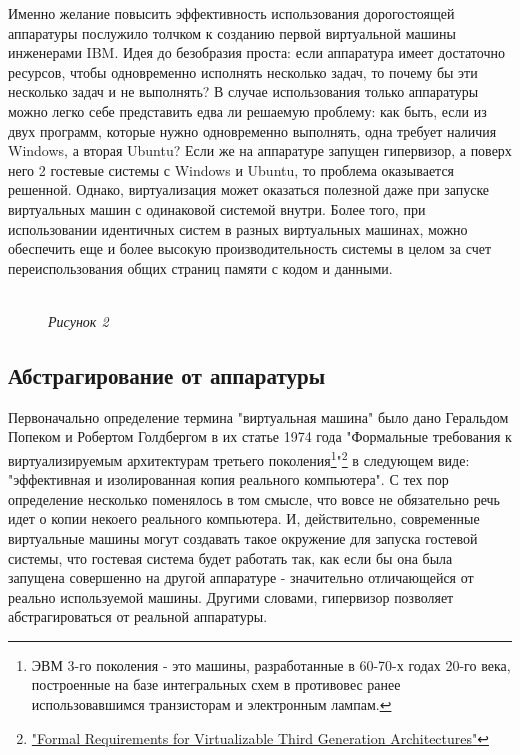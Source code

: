 \documentclass[14pt, a4paper]{article}
\begin{document}
Именно желание повысить эффективность использования дорогостоящей аппаратуры
послужило толчком к созданию первой виртуальной машины инженерами IBM. Идея до
безобразия проста: если аппаратура имеет достаточно ресурсов, чтобы одновременно
исполнять несколько задач, то почему бы эти несколько задач и не выполнять? В
случае использования только аппаратуры можно легко себе представить едва ли
решаемую проблему: как быть, если из двух программ, которые нужно одновременно
выполнять, одна требует наличия Windows, а вторая Ubuntu? Если же на аппаратуре
запущен гипервизор, а поверх него 2 гостевые системы с Windows и Ubuntu, то проблема оказывается решенной. Однако, виртуализация может оказаться полезной
даже при запуске виртуальных машин с одинаковой системой внутри. Более того, при
использовании идентичных систем в разных виртуальных машинах, можно обеспечить
еще и более высокую производительность системы в целом за счет
переиспользования общих страниц памяти с кодом и данными.

\begin{figure}[h]
    \centering
    \\
    \small\textit{Рисунок 2}
    \label{framework} 
\end{figure}

\subsection*{Абстрагирование от аппаратуры}

Первоначально определение термина "виртуальная машина" было дано Геральдом
Попеком и Робертом Голдбергом в их статье 1974 года "Формальные требования к
виртуализируемым архитектурам третьего поколения\footnote{ЭВМ 3-го поколения - это машины, разработанные в 60-70-х годах 20-го века, построенные на
базе интегральных схем в противовес ранее использовавшимся транзисторам и электронным
лампам.}"\footnote{\href{"Formal Requirements for Virtualizable Third Generation Architectures"}{"Formal Requirements for Virtualizable Third Generation Architectures"}} в следующем виде:
"эффективная и изолированная копия реального компьютера". С тех пор определение
несколько поменялось в том смысле, что вовсе не обязательно речь идет о копии
некоего реального компьютера. И, действительно, современные виртуальные машины
могут создавать такое окружение для запуска гостевой системы, что гостевая система
будет работать так, как если бы она была запущена совершенно на другой аппаратуре
- значительно отличающейся от реально используемой машины. Другими словами,
гипервизор позволяет абстрагироваться от реальной аппаратуры.
\end{document}
